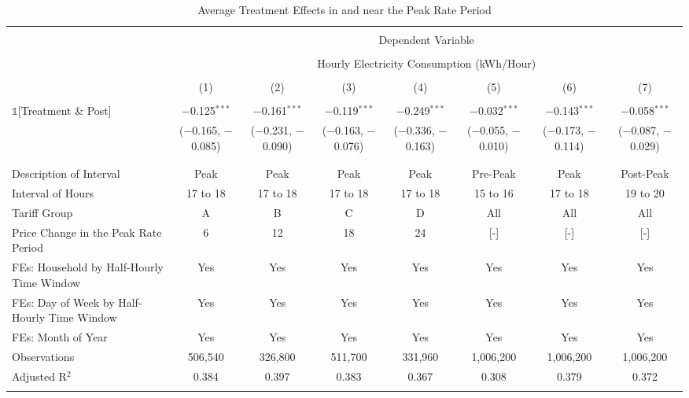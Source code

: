 
\begin{table}[!htbp] \centering 
  \caption{Average Treatment Effects in and near the Peak Rate Period} 
  \label{Table:Average-Treatment-Effects-in-and-near-the-Peak-Rate-Period} 
\small 
\begin{tabular}{@{\extracolsep{1pt}}lccccccc} 
\\[-1.8ex]\hline 
\hline \\[-1.8ex] 
 & \multicolumn{7}{c}{Dependent Variable} \\ 
\cline{2-8} 
\\[-1.8ex] & \multicolumn{7}{c}{Hourly Electricity Consumption  (kWh/Hour)} \\ 
\\[-1.8ex] & (1) & (2) & (3) & (4) & (5) & (6) & (7)\\ 
\hline \\[-1.8ex] 
 $\mathbb{1}$[Treatment \& Post] & $-$0.125$^{***}$ & $-$0.161$^{***}$ & $-$0.119$^{***}$ & $-$0.249$^{***}$ & $-$0.032$^{***}$ & $-$0.143$^{***}$ & $-$0.058$^{***}$ \\ 
  & ($-$0.165, $-$0.085) & ($-$0.231, $-$0.090) & ($-$0.163, $-$0.076) & ($-$0.336, $-$0.163) & ($-$0.055, $-$0.010) & ($-$0.173, $-$0.114) & ($-$0.087, $-$0.029) \\ 
  & & & & & & & \\ 
\hline \\[-1.8ex] 
Description of Interval & Peak & Peak & Peak & Peak & Pre-Peak & Peak & Post-Peak \\ 
Interval of Hours & 17 to 18 & 17 to 18 & 17 to 18 & 17 to 18 & 15 to 16 & 17 to 18 & 19 to 20 \\ 
Tariff Group & A & B & C & D & All & All & All \\ 
Price Change in the Peak Rate Period & 6 & 12 & 18 & 24 & [-] & [-] & [-] \\ 
FEs: Household by Half-Hourly Time Window & Yes & Yes & Yes & Yes & Yes & Yes & Yes \\ 
FEs: Day of Week by Half-Hourly Time Window & Yes & Yes & Yes & Yes & Yes & Yes & Yes \\ 
FEs: Month of Year & Yes & Yes & Yes & Yes & Yes & Yes & Yes \\ 
Observations & 506,540 & 326,800 & 511,700 & 331,960 & 1,006,200 & 1,006,200 & 1,006,200 \\ 
Adjusted R$^{2}$ & 0.384 & 0.397 & 0.383 & 0.367 & 0.308 & 0.379 & 0.372 \\ 
\hline 
\hline \\[-1.8ex] 
\end{tabular} 
\end{table} 
